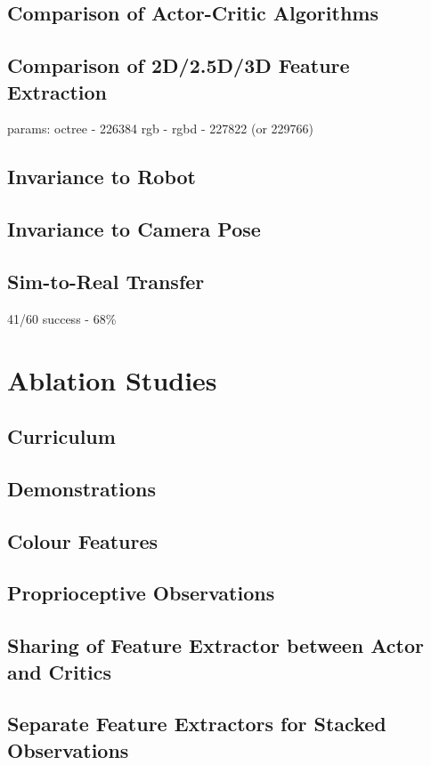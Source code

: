 \subsection{Comparison of Actor-Critic Algorithms}

\subsection{Comparison of 2D/2.5D/3D Feature Extraction}

params:
    octree - 226384
    rgb -
    rgbd - 227822 (or 229766)


\subsection{Invariance to Robot}

\subsection{Invariance to Camera Pose}

\subsection{Sim-to-Real Transfer}

41/60 success
- 68\%


\section{Ablation Studies}

\subsection{Curriculum}

\subsection{Demonstrations}

\subsection{Colour Features}

\subsection{Proprioceptive Observations}

\subsection{Sharing of Feature Extractor between Actor and Critics}

\subsection{Separate Feature Extractors for Stacked Observations}

